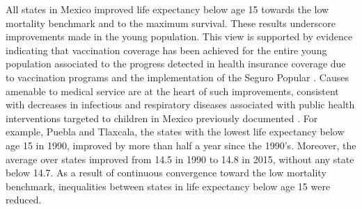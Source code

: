 \documentclass{bmcart}
\begin{document}
All states in Mexico improved life expectancy below age 15 towards the low mortality benchmark and to the maximum survival. These results underscore improvements made in the young population. This view is supported by evidence indicating that vaccination coverage has been achieved for the entire young population associated to the progress detected in health insurance coverage due to vaccination programs and the implementation of the Seguro Popular \cite{urquieta2015evolution}. Causes amenable to medical service are at the heart of such improvements, consistent with decreases in infectious and respiratory diseases associated with public health interventions targeted to children in Mexico previously documented \cite{sepulveda2006}. For example, Puebla and Tlaxcala, the states with the lowest life expectancy below age 15 in 1990, improved by more than half a year since the 1990's. Moreover, the average over states improved from 14.5 in 1990 to 14.8 in 2015, without any state below 14.7. As a result of continuous convergence toward the low mortality benchmark, inequalities between states in life expectancy below age 15 were reduced. 
\end{document}
